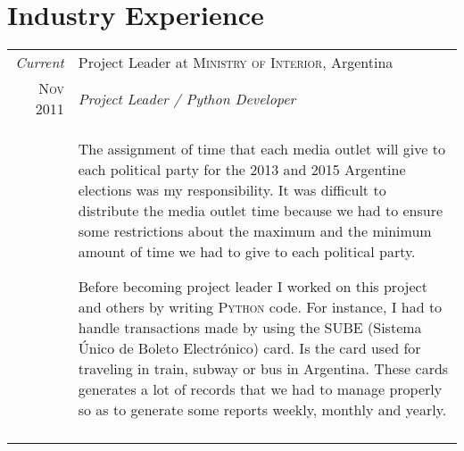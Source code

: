 \section{Industry Experience}
\begin{tabular}{r|p{11cm}}

 \emph{Current} & Project Leader at \textsc{Ministry of Interior}, Argentina \\
 \textsc{Nov 2011} & \emph{Project Leader / Python Developer}\\
 &\footnotesize{The assignment of time that each media outlet will give to each political party for the 2013 and 2015
 Argentine elections was my responsibility. It was difficult to distribute the media outlet time because we had to
 ensure some restrictions about the maximum and the minimum amount of time we had to give to each political party.
 
 Before becoming project leader I worked on this project and others by writing \textsc{Python} code. For instance, I
 had to handle transactions made by using the SUBE (Sistema Único de Boleto Electrónico) card. Is the card used for
 traveling in train, subway or bus in Argentina. These cards generates a lot of records that we had to manage properly
 so as to generate some reports weekly, monthly and yearly.} \\
 \multicolumn{2}{c}{}

 

  \textsc{May-Oct 2012}

\end{tabular}

